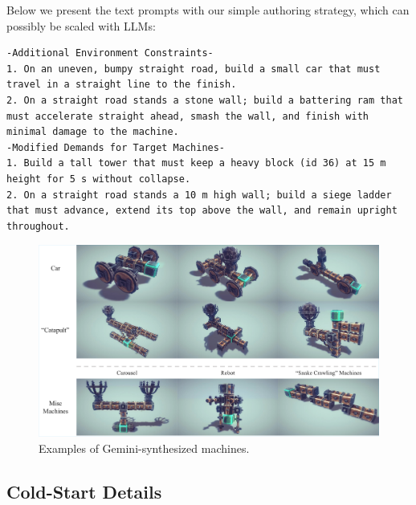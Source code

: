 Below we present the text prompts with our simple authoring strategy, which can possibly be scaled with LLMs:
\begin{lstlisting}
-Additional Environment Constraints-
1. On an uneven, bumpy straight road, build a small car that must travel in a straight line to the finish.
2. On a straight road stands a stone wall; build a battering ram that must accelerate straight ahead, smash the wall, and finish with minimal damage to the machine.
-Modified Demands for Target Machines-
1. Build a tall tower that must keep a heavy block (id 36) at 15 m height for 5 s without collapse.
2. On a straight road stands a 10 m high wall; build a siege ladder that must advance, extend its top above the wall, and remain upright throughout.
\end{lstlisting}





\begin{figure}[h!]
  \centering
  \includegraphics[width=\linewidth]{figures/synthesised_dataset_v3_cropped.pdf}
  \caption{\footnotesize Examples of Gemini-synthesized machines.}
  \label{fig:synthesized_dataset}
\end{figure}


























\subsection{Cold-Start Details} \label{sec:cold_start_details}

